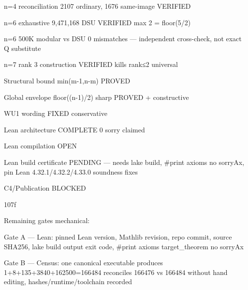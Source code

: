 n=4 reconciliation 2107 ordinary, 1676 same-image	VERIFIED

n=6 exhaustive 9,471,168 DSU	VERIFIED max 2 = floor(5/2)

n=6 500K modular vs DSU	0 mismatches — independent cross-check, not exact Q substitute

n=7 rank 3 construction	VERIFIED kills rank≤2 universal

Structural bound min(m-1,n-m)	PROVED

Global envelope floor((n-1)/2) sharp	PROVED + constructive

WU1 wording	FIXED conservative

Lean architecture	COMPLETE 0 sorry claimed

Lean compilation	OPEN

Lean build certificate	PENDING — needs lake build, #print axioms no sorryAx, pin Lean 4.32.1/4.32.2/4.33.0 soundness fixes

C4/Publication	BLOCKED

107f


Remaining gates mechanical:


Gate A — Lean: pinned Lean version, Mathlib revision, repo commit, source SHA256, lake build output exit code, #print axioms target_theorem no sorryAx


Gate B — Census: one canonical executable produces 1+8+135+3840+162500=166484 reconciles 166476 vs 166484 without hand editing, hashes/runtime/toolchain recorded


